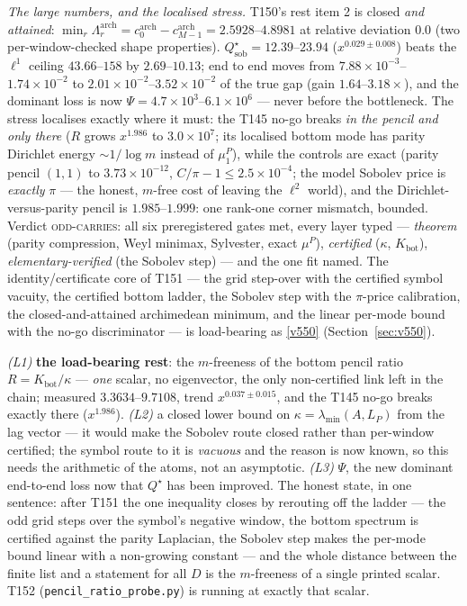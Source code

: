 \documentclass[11pt,a4paper]{article}
\begin{document}
\emph{The large numbers, and the localised stress.} T150's rest item 2 is closed \emph{and
attained}: $\min_r\Lambda^{\mathrm{arch}}_r=c^{\mathrm{arch}}_0-c^{\mathrm{arch}}_{M-1}
=2.5928$--$4.8981$ at relative deviation $0.0$ (two per-window-checked shape properties).
$Q^\star_{\mathrm{sob}}=12.39$--$23.94$ ($x^{0.029\pm0.008}$) beats the $\ell^1$ ceiling
$43.66$--$158$ by $2.69$--$10.13$; end to end moves from
$7.88\times10^{-3}$--$1.74\times10^{-2}$ to
$2.01\times10^{-2}$--$3.52\times10^{-2}$ of the true gap (gain $1.64$--$3.18\times$), and the
dominant loss is now $\Psi=4.7\times10^{3}$--$6.1\times10^{6}$ --- never before the
bottleneck. The stress localises exactly where it must: the T145 no-go breaks \emph{in the
pencil and only there} ($R$ grows $x^{1.986}$ to $3.0\times10^{7}$; its localised bottom mode
has parity Dirichlet energy $\sim1/\log m$ instead of $\mu^P_1$), while the controls are
exact (parity pencil $(1,1)$ to $3.73\times10^{-12}$, $C/\pi-1\le2.5\times10^{-4}$; the
model Sobolev price is \emph{exactly} $\pi$ --- the honest, $m$-free cost of leaving the
$\ell^2$ world), and the Dirichlet-versus-parity pencil is $1.985$--$1.999$: one rank-one
corner mismatch, bounded. Verdict \textsc{odd-carries}: all six preregistered gates met,
every layer typed --- \emph{theorem} (parity compression, Weyl minimax, Sylvester, exact
$\mu^P$), \emph{certified} ($\kappa$, $K_{\mathrm{bot}}$), \emph{elementary-verified} (the
Sobolev step) --- and the one fit named. The identity/certificate core of T151 --- the grid
step-over with the certified symbol vacuity, the certified bottom ladder, the Sobolev step
with the $\pi$-price calibration, the closed-and-attained archimedean minimum, and the linear
per-mode bound with the no-go discriminator --- is load-bearing as \vref{v550}
 (Section~\ref{sec:v550}).

\begin{keybox}
\emph{(L1)} \textbf{the load-bearing rest}: the $m$-freeness of the bottom pencil ratio
$R=K_{\mathrm{bot}}/\kappa$ --- \emph{one} scalar, no eigenvector, the only non-certified
link left in the chain; measured $3.3634$--$9.7108$, trend $x^{0.037\pm0.015}$, and the T145
no-go breaks exactly there ($x^{1.986}$). \emph{(L2)} a closed lower bound on
$\kappa=\lambda_{\min}(A,L_P)$ from the lag vector --- it would make the Sobolev route closed
rather than per-window certified; the symbol route to it is \emph{vacuous} and the reason is
now known, so this needs the arithmetic of the atoms, not an asymptotic. \emph{(L3)} $\Psi$,
the new dominant end-to-end loss now that $Q^\star$ has been improved. The honest state, in
one sentence: after T151 the one inequality closes by rerouting off the ladder --- the odd
grid steps over the symbol's negative window, the bottom spectrum is certified against the
parity Laplacian, the Sobolev step makes the per-mode bound linear with a non-growing
constant --- and the whole distance between the finite list and a statement for all $D$ is
the $m$-freeness of a single printed scalar.
T152 (\texttt{pencil\_ratio\_probe.py}) is running at exactly that scalar.
\end{keybox}
\end{document}
